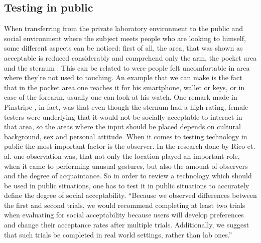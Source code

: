 \documentclass{sigchi}
\begin{document}
\subsection{Testing in public}
%
When transferring from the private laboratory environment to the public and social environment where the subject meets people who are looking to himself, some different aspects can be noticed: first of all, the area, that was shown as acceptable is reduced considerably and comprehend only the arm, the pocket area and the sternum \cite{pinstripe}. This can be related to \cite{more-touch} were people felt uncomfortable in area where they’re not used to touching. An example that we can make is the fact that in the pocket area one reaches it for his smartphone, wallet or keys, or in case of the forearm, usually one can look at his watch. One remark made in Pinstripe \cite{pinstripe}, in fact, was that even though the sternum had a high rating, female testers were underlying that it would not be socially acceptable to interact in that area, so the areas where the input should be placed depends on cultural background, sex and personal attitude.
When it comes to testing technology in public the most important factor is the observer. In the research done by Rico et. al. \cite{usable-gesture} one observation was, that not only the location played an important role, when it came to performing unusual gestures, but also the amount of observers and the degree of acquaintance. So in order to review a technology which should be used in public situations, one has to test it in public situations to accurately define the degree of social acceptability.
“Because we observed differences between the first and second trials, we would recommend completing at least two trials when evaluating for social acceptability because users will develop preferences and change their acceptance rates after multiple trials. Additionally, we suggest that such trials be completed in real world settings, rather than lab ones.” \cite[p. 9]{usable-gesture}%
\end{document}
